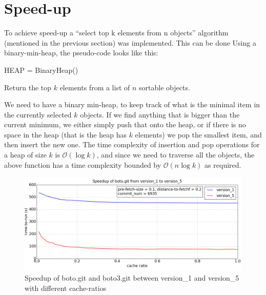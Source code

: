 \documentclass[12pt,twoside,notitlepage]{report}
\begin{document}
\section{Speed-up}\label{gettopk}
To achieve speed-up a ``select top k elements from n objects'' algorithm (mentioned in the previous section) was implemented. This can be done Using a binary-min-heap, the pseudo-code looks like this:
\vspace{1em}
\begin{algorithm}[H]
HEAP = BinaryHeap()\\
\caption{Return the top $k$ elements from a list of $n$ sortable objects.}
\end{algorithm}
\vspace{1em}
We need to have a binary min-heap, to keep track of what is the minimal item in the currently selected $k$ objects. If we find anything that is bigger than the current minimum, we either simply push that onto the heap, or if there is no space in the heap (that is the heap has $k$ elements) we pop the smallest item, and then insert the new one. The time complexity of insertion and pop operations for a heap of size $k$ is $\mathcal{O}(\log{k})$, and since we need to traverse all the objects, the above function has a time complexity bounded by $\mathcal{O}(n\log{k})$ as required.
\begin{figure}[h]
\includegraphics[width=1.0\textwidth]{speedup.png}

\caption{Speedup of boto.git and boto3.git between version\_1 and version\_5 with different cache-ratios}
\label{fig:speedup}
\end{figure}
\end{document}
